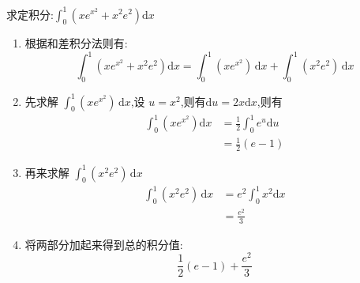\begin{questions}
	\question 求定积分:$\int_0^1\left(xe^{x^2} + x^2e^2\right)\mathrm{d}x$
	\begin{solution}
		\begin{enumerate}[label=\arabic*.]
			\item 根据和差积分法则有:
			      \begin{equation*}
				      \int_0^1\left(xe^{x^2} + x^2e^2\right)\mathrm{d}x  = \int_0^1(xe^{x^2})\,\mathrm{d}x + \int_0^1(x^2e^2)\,\mathrm{d}x
			      \end{equation*}
			\item 先求解 $\int_0^1(xe^{x^2})\,\mathrm{d}x $,设 $u=x^2$,则有$\mathrm{d}u=2x\mathrm{d}x$,则有
			      \begin{align*}
				      \int_0^1(xe^{x^2})\mathrm{d}x & = \frac12\int_0^1e^u\mathrm{d}u \\
				                                    & = \frac12(e-1)
			      \end{align*}
			\item 再来求解 $\int_0^1(x^2e^2)\,\mathrm{d}x$
			      \begin{align*}
				      \int_0^1(x^2e^2)\,\mathrm{d}x & = e^2\int_0^1x^2\mathrm{d}x \\
				                                    & = \frac{e^2}{3}
			      \end{align*}
			\item 将两部分加起来得到总的积分值:
			      \begin{equation*}
				      \frac12(e-1) + \frac{e^2}{3}
			      \end{equation*}
		\end{enumerate}
	\end{solution}
\end{questions}
